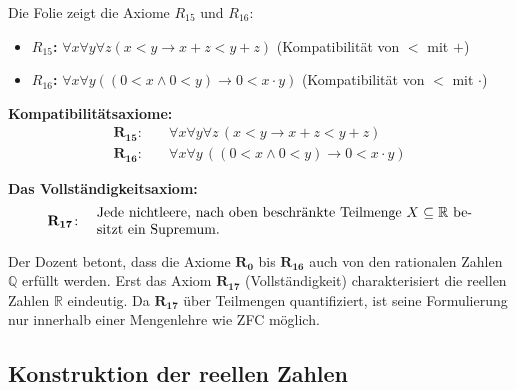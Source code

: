 \begin{meta-note}
Die Folie zeigt die Axiome $R_{15}$ und $R_{16}$:
\begin{itemize}
    \item \textbf{$R_{15}$:} $\forall x \forall y \forall z (x < y \to x + z < y + z)$ (Kompatibilität von $<$ mit $+$)
    \item \textbf{$R_{16}$:} $\forall x \forall y ((0 < x \land 0 < y) \to 0 < x \cdot y)$ (Kompatibilität von $<$ mit $\cdot$)
\end{itemize}
\end{meta-note}

\begin{math-stroke}
\textbf{Kompatibilitätsaxiome:}
\begin{align}
    \mathbf{R_{15}}\colon &\quad \forall x \forall y \forall z \, (x < y \to x + z < y + z) \label{eq:R15} \\
    \mathbf{R_{16}}\colon &\quad \forall x \forall y \, ((0 < x \land 0 < y) \to 0 < x \cdot y) \label{eq:R16}
\end{align}

\textbf{Das Vollständigkeitsaxiom:}
\begin{equation}\label{eq:R17}
\mathbf{R_{17}\colon} \quad \parbox{0.78\textwidth}{Jede nichtleere, nach oben beschränkte Teilmenge $X \subseteq \mathbb{R}$ besitzt ein Supremum.}
\end{equation}

\begin{explanation-of-steps}
Der Dozent betont, dass die Axiome $\mathbf{R_0}$ bis $\mathbf{R_{16}}$ auch von den rationalen Zahlen $\mathbb{Q}$ erfüllt werden. Erst das Axiom $\mathbf{R_{17}}$ (Vollständigkeit) charakterisiert die reellen Zahlen $\mathbb{R}$ eindeutig. Da $\mathbf{R_{17}}$ über Teilmengen quantifiziert, ist seine Formulierung nur innerhalb einer Mengenlehre wie ZFC möglich.
\end{explanation-of-steps}
\end{math-stroke}

\subsection{Konstruktion der reellen Zahlen}


